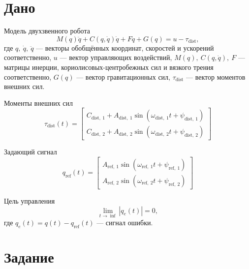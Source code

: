 \documentclass[14pt]{extarticle}
\begin{document}
    

    \section*{Дано}
    Модель двухзвенного робота
    \begin{equation}
        \label{eq:sys}
        M(q)\ddot{q} + C(q, \dot{q})\dot{q} + F\dot{q} +G(q) = u - \tau_\text{dist},
    \end{equation}
    где $q,\ \dot{q},\ \ddot{q}$ --- векторы обобщённых координат, скоростей и ускорений соответственно,
    $u$ --- вектор управляющих воздействий,
    $M(q),\ C(q,\dot{q}),\ F$ --- матрицы инерции, кориолисовых-центробежных сил и вязкого трения соответственно,
    $G(q)$ --- вектор гравитационных сил,
    $\tau_\text{dist}$ --- вектор моментов внешних сил.
    \newline

    Моменты внешних сил
    \begin{equation}
        \label{eq:ext moments}
        \tau_\text{dist}(t) =
        \begin{bmatrix}
            C_{\text{dist},\ 1} + A_{\text{dist},\ 1}\sin(\omega_{\text{dist},\ 1}t + \psi_{\text{dist},\ 1})\\
            C_{\text{dist},\ 2} + A_{\text{dist},\ 2}\sin(\omega_{\text{dist},\ 2}t + \psi_{\text{dist},\ 2})
        \end{bmatrix}
    \end{equation}

    Задающий сигнал
    \begin{equation}
        \label{eq:traject}
        q_{\text{ref}}(t) =
        \begin{bmatrix}
            A_{\text{ref},\ 1}\sin(\omega_{\text{ref},\ 1}t + \psi_{\text{ref},\ 1})\\
            A_{\text{ref},\ 2}\sin(\omega_{\text{ref},\ 2}t + \psi_{\text{ref},\ 2})
        \end{bmatrix}
    \end{equation}

    Цель управления
    \begin{equation}
        \label{eq:goal}
        \lim_{t \rightarrow \inf }\left| q_e(t) \right| = 0,
    \end{equation}
    где $q_e(t) = q(t) - q_\text{ref}(t)$ --- сигнал ошибки.

    \section*{Задание}
\end{document}
